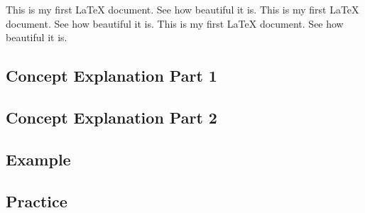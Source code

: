 This is my first LaTeX document. See how beautiful it is. 
This is my first LaTeX document. See how beautiful it is.
This is my first LaTeX document. See how beautiful it is.
\subsection*{Concept Explanation Part 1}

\subsection*{Concept Explanation Part 2}

\subsection*{Example}

\subsection*{Practice}
